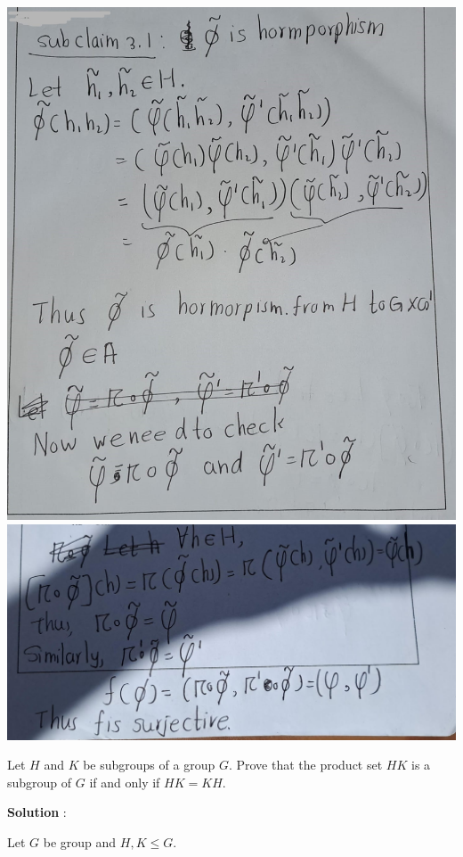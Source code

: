 \documentclass[
]{book}
\begin{document}
\includegraphics{figures/ch_2/fig15.jpg}
\includegraphics{figures/ch_2/fig16.jpg}

\leavevmode{}%
Let \(H\) and \(K\) be subgroups of a group \(G\). Prove that the
product set \(HK\) is a subgroup of \(G\) if and only if \(HK = KH\).

\textbf{Solution} :

Let \(G\) be group and \(H,K\leq G\).
\end{document}
